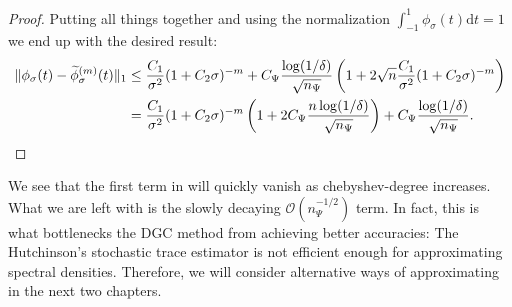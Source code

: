 \begin{proof}
    Putting all things together and using the normalization $\int_{-1}^{1} \phi_{\sigma}(t) \mathrm{d}t = 1$
    we end up with the desired result:
    \begin{align*}
        \lVert \phi_{\sigma}(t)  - \widetilde{\phi}_{\sigma}^{(m)}(t) \rVert _1
        &\leq \frac{C_1}{\sigma^2} (1 + C_2 \sigma)^{-m} + C_{\Psi} \frac{\log(1/\delta)}{\sqrt{n_{\Psi}}} \left( 1 + 2 \sqrt{n} \frac{C_1}{\sigma^2} (1 + C_2 \sigma)^{-m} \right) \notag \\
        &= \frac{C_1}{\sigma^2} (1 + C_2 \sigma)^{-m} \left( 1 + 2 C_{\Psi} \frac{n \log(1/\delta)}{\sqrt{n_{\Psi}}} \right) + C_{\Psi} \frac{\log(1/\delta)}{\sqrt{n_{\Psi}}}.
    \end{align*}
\end{proof}

We see that the first term in  will quickly
vanish as \gls{chebyshev-degree} increases. What we are left with is the slowly
decaying $\mathcal{O}(n_{\Psi}^{-1/2})$ term. In fact, this is what bottlenecks
the \gls{DGC} method from achieving better accuracies: The Hutchinson's stochastic
trace estimator is not efficient enough for approximating spectral densities.
Therefore, we will consider alternative ways of approximating 
in the next two chapters.
